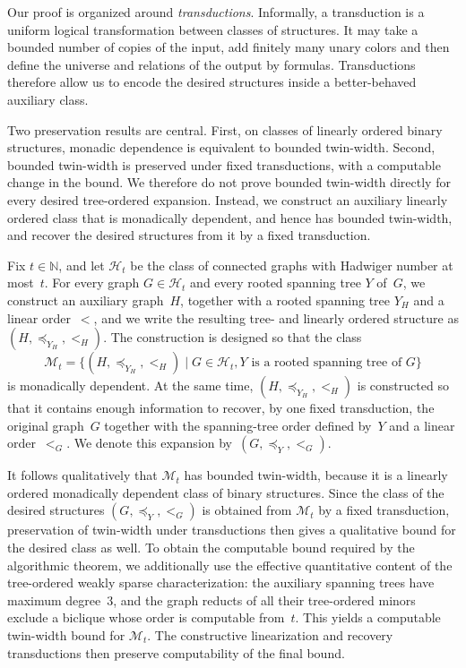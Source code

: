 \documentclass[1p,number,11pt]{elsarticle}
\theoremstyle{plain}
\begin{document}
\medskip 

Our proof is organized around \emph{transductions}. Informally, a transduction
is a uniform logical transformation between classes of structures. It may
take a bounded number of copies of the input, add finitely many unary colors 
and then define the universe and relations of the output by formulas.
Transductions therefore allow us to encode the desired structures inside a
better-behaved auxiliary class.

Two preservation results are central. First, on classes of linearly ordered
binary structures, monadic dependence is equivalent to bounded twin-width.
Second, bounded twin-width is preserved under fixed transductions, with a
computable change in the bound. We therefore do not prove bounded twin-width
directly for every desired tree-ordered expansion. Instead, we construct an
auxiliary linearly ordered class that is monadically dependent, and hence has
bounded twin-width, and recover the desired structures from it by a fixed
transduction.

Fix $t\in\mathbb N$, and let $\mathscr H_t$ be the class of connected graphs with Hadwiger number at most~$t$.
For every graph $G\in \mathscr H_t$ and every rooted spanning tree $Y$ of~$G$,
we construct an auxiliary graph~$H$, together with a rooted spanning tree
$Y_H$ and a linear order~$<$, and we write the resulting tree- and linearly
ordered structure as $(H,\preceq_{Y_H},<_H)$.
The construction is designed so that the
class
\[
    \mathscr M_t = \{ (H,\preceq_{Y_H},<_H) \mid G\in \mathscr H_t,
    \text{$Y$ is a rooted spanning tree of $G$} \}
\]
is monadically dependent. At the same time, $(H,\preceq_{Y_H},<_H)$ is constructed so
that it contains enough information to recover, by one fixed transduction,
the original graph~$G$ together with the spanning-tree order defined by~$Y$
and a linear order~$<_G$. We denote this expansion by~$(G,\preceq_Y,<_G)$.

It follows qualitatively that $\mathscr M_t$ has bounded twin-width, because it
is a linearly ordered monadically dependent class of binary structures. Since
the class of the desired structures $(G,\preceq_Y,<_G)$ is obtained from $\mathscr M_t$ by
a fixed transduction, preservation of twin-width under transductions then
gives a qualitative bound for the desired class as well. To obtain the
computable bound required by the algorithmic theorem, we additionally use
the effective quantitative content of the tree-ordered weakly sparse
characterization: the auxiliary spanning trees have maximum degree~$3$, and
the graph reducts of all their tree-ordered minors exclude a biclique whose
order is computable from~$t$. This yields a computable twin-width bound for
$\mathscr M_t$. The constructive linearization and recovery transductions then
preserve computability of the final bound.
\end{document}
